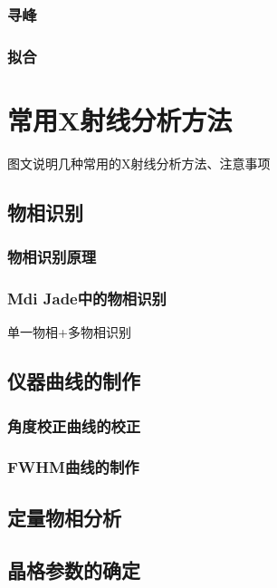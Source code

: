 \documentclass[12pt,a4paper]{ctexart}
\newcommand{\smtext}[1]{{\fontsize{9.3pt}{12pt}\selectfont #1}}
\begin{document}
\subsubsection{寻峰}

\subsubsection{拟合}

\section{常用X射线分析方法}

\smtext{图文说明几种常用的X射线分析方法、注意事项}

\subsection{物相识别}

\subsubsection{物相识别原理}

\subsubsection{Mdi Jade中的物相识别}

\smtext{单一物相+多物相识别}

\subsection{仪器曲线的制作}

\subsubsection{角度校正曲线的校正}

\subsubsection{FWHM曲线的制作}

\subsection{定量物相分析}

\subsection{晶格参数的确定}
\end{document}
